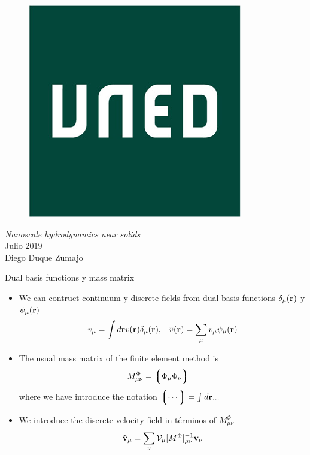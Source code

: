 \documentclass{beamer}
\newcommand{\llg}{\left\lgroup}
\newcommand{\rlg}{\right\rgroup}
\begin{document}
\begin{frame}
\begin{figure}
\includegraphics[width=0.2\linewidth]{logo}
\end{figure}
  \vspace{0.5cm}  
\begin{center}
\textit{Nanoscale hydrodynamics near solids}\\
Julio 2019\\
Diego Duque Zumajo
\end{center}

\end{frame}

\begin{frame}{Dual basis functions y mass matrix}
  \begin{itemize}
  \item We can contruct continuum y discrete fields from dual basis functions $\delta_{\mu}({\bf r})$ y $\psi_\mu({\bf r})$ 
    \begin{align}
      v_\mu=\int d{\bf r}v({\bf r})\delta_\mu({\bf r}),&&
        \overline{v}({\bf r}) =\sum_{\mu}v_\mu\psi_\mu({\bf r})
    \nonumber
    \end{align}
    \item The usual mass matrix of the finite element method is
      \begin{align}
      M^\Phi_{\mu\nu}&=\llg\Phi_\mu\Phi_\nu\rlg  
      \nonumber
      \end{align}
      where we have introduce the notation $\llg\cdots\rlg=\int d{\bf r}...$
    \item We introduce the discrete velocity field in términos of $M^\Phi_{\mu\nu}$
      \begin{align}
        \tilde{{\bf v}}_{\mu}=\sum_{\nu}{\cal V}_{\mu}[M^{\Phi}]^{-1}_{\mu\nu}{\bf v}_{\nu}
        \nonumber
      \end{align}
  \end{itemize}
\end{frame}
\end{document}
